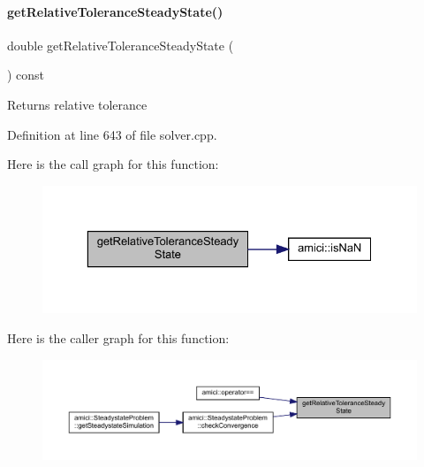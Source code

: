\paragraph{\texorpdfstring{getRelativeToleranceSteadyState()}{getRelativeToleranceSteadyState()}}
{\footnotesize\ttfamily double get\+Relative\+Tolerance\+Steady\+State (\begin{DoxyParamCaption}{ }\end{DoxyParamCaption}) const}

\begin{DoxyReturn}{Returns}
relative tolerance 
\end{DoxyReturn}


Definition at line 643 of file solver.\+cpp.

Here is the call graph for this function\+:
\nopagebreak
\begin{figure}[H]
\begin{center}
\leavevmode
\includegraphics[width=329pt]{classamici_1_1_solver_ae598de1a48d3c4af1d08b8436d481e11_cgraph}
\end{center}
\end{figure}
Here is the caller graph for this function\+:
\nopagebreak
\begin{figure}[H]
\begin{center}
\leavevmode
\includegraphics[width=350pt]{classamici_1_1_solver_ae598de1a48d3c4af1d08b8436d481e11_icgraph}
\end{center}
\end{figure}
\mbox{\label{classamici_1_1_solver_abdc290e52ae8a037aa65648f044c1ab5}} 

